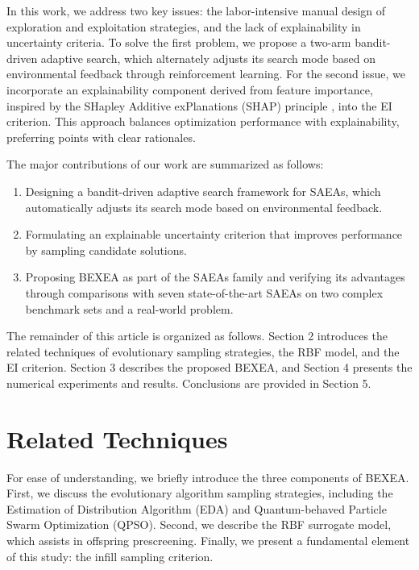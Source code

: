 \documentclass[review]{elsarticle}
\begin{document}
In this work, we address two key issues: the labor-intensive manual design of exploration and exploitation strategies, and the lack of explainability in uncertainty criteria. To solve the first problem, we propose a two-arm bandit-driven \cite{slivkins2019introduction} adaptive search, which alternately adjusts its search mode based on environmental feedback through reinforcement learning. For the second issue, we incorporate an explainability component derived from feature importance, inspired by the SHapley Additive exPlanations (SHAP) principle \cite{nohara2022explanation}, into the EI criterion. This approach balances optimization performance with explainability, preferring points with clear rationales.

The major contributions of our work are summarized as follows:
\begin{enumerate}[label=\arabic*)]
  \item Designing a bandit-driven adaptive search framework for SAEAs, which automatically adjusts its search mode based on environmental feedback.
  \item Formulating an explainable uncertainty criterion that improves performance by sampling candidate solutions.
  \item Proposing BEXEA as part of the SAEAs family and verifying its advantages through comparisons with seven state-of-the-art SAEAs on two complex benchmark sets and a real-world problem.
\end{enumerate}

The remainder of this article is organized as follows. Section 2 introduces the related techniques of evolutionary sampling strategies, the RBF model, and the EI criterion. Section 3 describes the proposed BEXEA, and Section 4 presents the numerical experiments and results. Conclusions are provided in Section 5.

\section{Related Techniques}

For ease of understanding, we briefly introduce the three components of BEXEA. First, we discuss the evolutionary algorithm sampling strategies, including the Estimation of Distribution Algorithm (EDA) and Quantum-behaved Particle Swarm Optimization (QPSO). Second, we describe the RBF surrogate model, which assists in offspring prescreening. Finally, we present a fundamental element of this study: the  infill sampling criterion.
\end{document}
